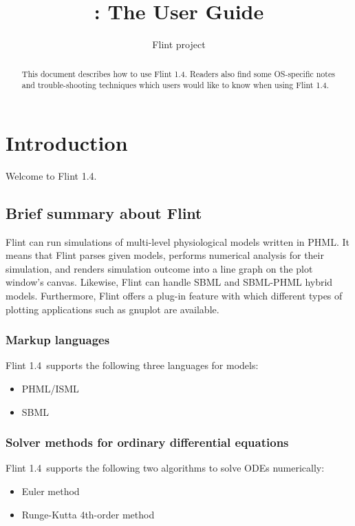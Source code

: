 \documentclass[a4paper,10pt]{report}
\title{\Flint: The User Guide}
\author{Flint project}
\def\FlintVersion{1.4}
\def\Flint{Flint \FlintVersion}
\begin{document}
\maketitle

\begin{abstract}
This document describes how to use \Flint.
Readers also find some OS-specific notes and trouble-shooting techniques which
users would like to know when using \Flint.
\end{abstract}

\tableofcontents



\chapter{Introduction}
Welcome to \Flint.

\section{Brief summary about Flint}
Flint can run simulations of multi-level physiological models written in PHML.
It means that Flint parses given models, performs numerical analysis for their
simulation, and renders simulation outcome into a line graph on the plot
window's canvas. Likewise, Flint can handle SBML and SBML-PHML hybrid models.
Furthermore, Flint offers a plug-in feature with which different types of
plotting applications such as gnuplot are available.

\subsection{Markup languages}
\Flint\ supports the following three languages for models:
\begin{itemize}
\item PHML/ISML
\item SBML
\end{itemize}

\subsection{Solver methods for ordinary differential equations}
\Flint\ supports the following two algorithms to solve ODEs numerically:
\begin{itemize}
\item Euler method
\item Runge-Kutta 4th-order method
\end{itemize}
\end{document}
